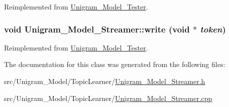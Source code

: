 Reimplemented from \hyperlink{class_unigram___model___tester_a3d6b3c06e90df22b72bbd979eedef78e}{Unigram\_\-Model\_\-Tester}.

\hypertarget{class_unigram___model___streamer_a236395088d23966ec59a85582e4d470f}{
\subsubsection[{write}]{\setlength{\rightskip}{0pt plus 5cm}void Unigram\_\-Model\_\-Streamer::write (void $\ast$ {\em token})}}
\label{class_unigram___model___streamer_a236395088d23966ec59a85582e4d470f}


Reimplemented from \hyperlink{class_unigram___model___tester_a9f9538866008fd7dfd681faaf4562b74}{Unigram\_\-Model\_\-Tester}.



The documentation for this class was generated from the following files:\begin{DoxyCompactItemize}
\item 
src/Unigram\_\-Model/TopicLearner/\hyperlink{_unigram___model___streamer_8h}{Unigram\_\-Model\_\-Streamer.h}\item 
src/Unigram\_\-Model/TopicLearner/\hyperlink{_unigram___model___streamer_8cpp}{Unigram\_\-Model\_\-Streamer.cpp}\end{DoxyCompactItemize}
